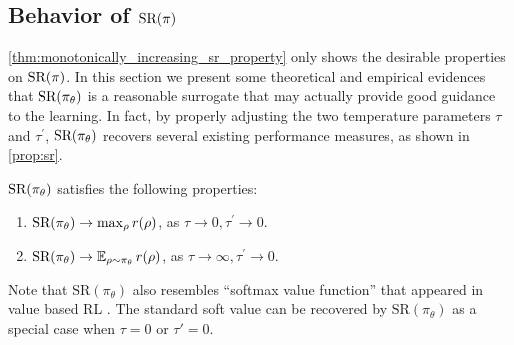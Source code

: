 \subsection{Behavior of $\text{SR}(\pi)$}
\label{subsec:sr}
\cref{thm:monotonically_increasing_sr_property} only shows the desirable properties on $\text{SR}(\pi)$.
In this section we present some theoretical and empirical evidences that $\text{SR}(\pi_\theta)$ is a reasonable surrogate that may actually provide good guidance to the learning. 
In fact, by properly adjusting the two temperature parameters $\tau$ and $\tau^{\prime}$, $\text{SR}(\pi_\theta)$ recovers several existing performance measures, as shown in \cref{prop:sr}.
\begin{prop}
\label{prop:sr}
$\text{SR}(\pi_\theta)$ satisfies the following properties:
\begin{enumerate}[label=(\roman*)]
	\item  $\text{SR}(\pi_\theta) \to \max_{\rho}{r(\rho)}$, as $\tau \to 0, \tau^{\prime} \to 0$.
	\item $\text{SR}(\pi_\theta) \to \operatorname*{\mathbb{E}}_{\rho \sim \pi_\theta}{r(\rho)}$, as $\tau \to \infty, \tau^{\prime} \to 0$. 
\end{enumerate}	
\end{prop}
\begin{remk}
	Note that $\text{SR}(\pi_\theta)$ also resembles ``softmax value function'' that appeared in value based RL \citep{nachum2017bridging,haarnoja2018soft,ding2017cold}. The standard soft value can be recovered by $\text{SR}(\pi_\theta)$ as a special case when $\tau = 0$ or $\tau'=0$. 
\end{remk}

